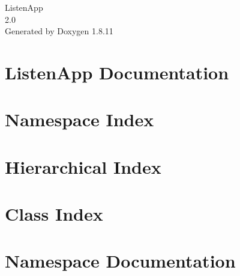 \documentclass[twoside]{book}
\newcommand{\+}{\discretionary{\mbox{\scriptsize$\hookleftarrow$}}{}{}}
\newcommand{\clearemptydoublepage}{%
  \newpage{\pagestyle{empty}\cleardoublepage}%
}
\begin{document}
\hypersetup{pageanchor=false,
             bookmarksnumbered=true,
             pdfencoding=unicode
            }
\begin{titlepage}
\vspace*{7cm}
\begin{center}%
{\Large Listen\+App \\[1ex]\large 2.\+0 }\\
\vspace*{1cm}
{\large Generated by Doxygen 1.8.11}\\
\end{center}
\end{titlepage}
\clearemptydoublepage
\tableofcontents
\clearemptydoublepage
{}
\hypersetup{pageanchor=true}

\chapter{Listen\+App Documentation}
\label{index}\hypertarget{index}{}
\chapter{Namespace Index}

\chapter{Hierarchical Index}

\chapter{Class Index}

\chapter{Namespace Documentation}





\end{document}
